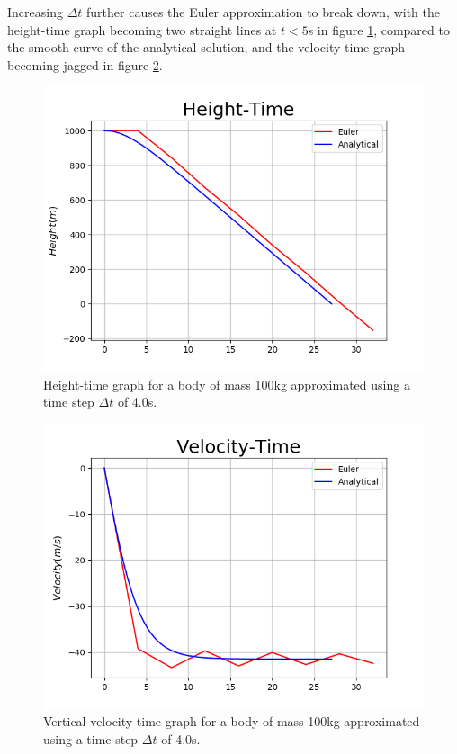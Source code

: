 \documentclass[twocolumn,prl,nobalancelastpage,aps,10pt]{revtex4-1}
\begin{document}
Increasing $\Delta t$ further causes the Euler approximation to break down, with the height-time graph becoming two straight lines at $t<5$s in figure \ref{ana-fig-ht-t=4.0}, compared to the smooth curve of the analytical solution, and the velocity-time graph becoming jagged in figure \ref{ana-fig-vt-t=4.0}.
\begin{figure}
	\includegraphics*[width=0.96\linewidth,clip]{ana-fig-ht-t=40}
	\caption{Height-time graph for a body of mass 100kg approximated using a time step $\Delta t$ of  4.0s.}\label{ana-fig-ht-t=4.0}
\end{figure}
\begin{figure}
	\includegraphics*[width=0.96\linewidth,clip]{ana-fig-vt-t=40}
	\caption{Vertical velocity-time graph for a body of mass 100kg approximated using a time step $\Delta t$ of  4.0s.}\label{ana-fig-vt-t=4.0}
\end{figure}
\end{document}
